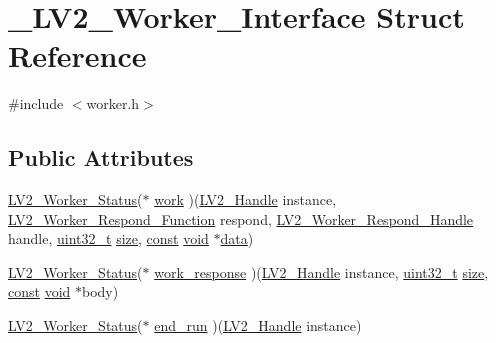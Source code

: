 \hypertarget{struct___l_v2___worker___interface}{}\section{\+\_\+\+L\+V2\+\_\+\+Worker\+\_\+\+Interface Struct Reference}
\label{struct___l_v2___worker___interface}


{\ttfamily \#include $<$worker.\+h$>$}

\subsection*{Public Attributes}
\begin{DoxyCompactItemize}
\item 
\hyperlink{worker_8h_a5f3f4a39cc339d42f0823524940aee9f}{L\+V2\+\_\+\+Worker\+\_\+\+Status}($\ast$ \hyperlink{struct___l_v2___worker___interface_adca45fc94ebe7c3318ebb26490e593e5}{work} )(\hyperlink{lv2_8h_a95eafb0a5290f30bcdc8c0f8eb992eaf}{L\+V2\+\_\+\+Handle} instance, \hyperlink{worker_8h_a5a1c8b649127f905948553b31dacf211}{L\+V2\+\_\+\+Worker\+\_\+\+Respond\+\_\+\+Function} respond, \hyperlink{worker_8h_af5f7f9c5dda77351d70672075fb4d80e}{L\+V2\+\_\+\+Worker\+\_\+\+Respond\+\_\+\+Handle} handle, \hyperlink{lib-src_2ffmpeg_2win32_2stdint_8h_a6eb1e68cc391dd753bc8ce896dbb8315}{uint32\+\_\+t} \hyperlink{group__lavu__mem_ga854352f53b148adc24983a58a1866d66}{size}, \hyperlink{getopt1_8c_a2c212835823e3c54a8ab6d95c652660e}{const} \hyperlink{sound_8c_ae35f5844602719cf66324f4de2a658b3}{void} $\ast$\hyperlink{lib_2expat_8h_ac39e72a1de1cb50dbdc54b08d0432a24}{data})
\item 
\hyperlink{worker_8h_a5f3f4a39cc339d42f0823524940aee9f}{L\+V2\+\_\+\+Worker\+\_\+\+Status}($\ast$ \hyperlink{struct___l_v2___worker___interface_a4b3c69fccf0132cc5da461dacabdf4d6}{work\+\_\+response} )(\hyperlink{lv2_8h_a95eafb0a5290f30bcdc8c0f8eb992eaf}{L\+V2\+\_\+\+Handle} instance, \hyperlink{lib-src_2ffmpeg_2win32_2stdint_8h_a6eb1e68cc391dd753bc8ce896dbb8315}{uint32\+\_\+t} \hyperlink{group__lavu__mem_ga854352f53b148adc24983a58a1866d66}{size}, \hyperlink{getopt1_8c_a2c212835823e3c54a8ab6d95c652660e}{const} \hyperlink{sound_8c_ae35f5844602719cf66324f4de2a658b3}{void} $\ast$body)
\item 
\hyperlink{worker_8h_a5f3f4a39cc339d42f0823524940aee9f}{L\+V2\+\_\+\+Worker\+\_\+\+Status}($\ast$ \hyperlink{struct___l_v2___worker___interface_a382139d28995ca0ee147fb89220f64bd}{end\+\_\+run} )(\hyperlink{lv2_8h_a95eafb0a5290f30bcdc8c0f8eb992eaf}{L\+V2\+\_\+\+Handle} instance)
\end{DoxyCompactItemize}



